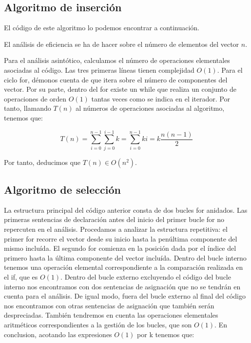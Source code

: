 \documentclass{homework}
\begin{document}
    \subsection{Algoritmo de inserción}

    El código de este algoritmo lo podemos encontrar a continuación.

    
    
    El análisis de eficiencia se ha de hacer sobre el número de elementos del vector $n$. 

    Para el análisis asintótico, calculamos el número de operaciones elementales asociadas al código. 
    Las tres primeras líneas tienen complejidad $O(1)$. Para el ciclo for, démonos cuenta de que itera sobre el número de
    componentes del vector. Por su parte, dentro del for existe un while que realiza un conjunto de operaciones de orden
    $O(1)$ tantas veces como se indica en el iterador. Por tanto, llamando $T(n)$ al números de operaciones asociadas
    al algoritmo, tenemos que:

    \begin{equation*}
        T(n) = \sum_{i=0}^{n-1} \sum_{j=0}^{i-1} k = \sum_{i=0}^{n-1} ki = k \frac{n(n-1)}{2} 
    \end{equation*}

    Por tanto, deducimos que $T(n) \in O(n^2)$. 

    \subsection{Algoritmo de selección}

        

    La estructura principal del código anterior consta de dos bucles for anidados. Las primeras sentencias de declaración antes del inicio del primer 
    bucle for no repercuten en el análisis. Procedamos a analizar la estructura repetitiva: el primer for recorre el vector desde su inicio hasta
    la penúltima componente del mismo incluída. El segundo for comienza en la posición dada por el índice del primero hasta la última componente del vector incluída.
    Dentro del bucle interno tenemos una operación elemental correspondiente a la comparación realizada en el if, que es $O(1)$. Dentro del bucle externo excluyendo 
    el código del bucle interno nos encontramos con dos sentencias de asignación que no se tendrán en cuenta para el análisis. De igual modo, fuera del bucle externo
    al final del código nos encontramos con otras sentencias de asignación que también serán despreciadas. También tendremos en cuenta las operaciones elementales
    aritméticos correspondientes a la gestión de los bucles, que son $O(1)$. En conclusion, acotando las expresiones $O(1)$ por k tenemos que: 
\end{document}
